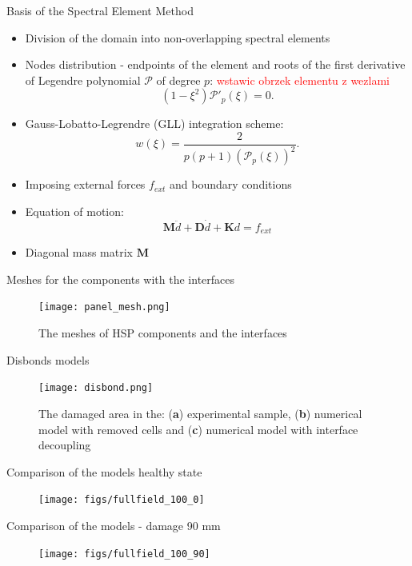 \documentclass[10pt,aspectratio=169]{beamer} %
\begin{document}
\begin{frame}[label=frame8]{Basis of the Spectral Element Method}
	\begin{itemize}
		\item Division of the domain into non-overlapping spectral elements
		\item Nodes distribution - endpoints of the element and roots of the first derivative of Legendre polynomial \(\mathcal{P}\) of degree \(p\):
		\textcolor{red}{wstawic obrzek elementu z wezlami}
		\begin{equation*}
			(1-\xi^2)\mathcal{P}'_{p}(\xi)=0.
			\label{eq:nodes}
		\end{equation*}
		\item Gauss-Lobatto-Legrendre (GLL) integration scheme:
		\begin{equation*}
			{w(\xi)} = \frac{2}{p(p+1)(\mathcal{P}_{p}(\xi))^2}.
			\label{eq:weight}
		\end{equation*}
		\item Imposing external forces \(f_{ext}\) and boundary conditions
		\item Equation of motion:
		\begin{equation*}
			\label{eq:motion}
			\textbf{M} \ddot{d} + \textbf{D} \dot{d} + \textbf{K} d = f_{ext}
		\end{equation*}
		\item Diagonal mass matrix $\textbf{M}$
	\end{itemize}
\end{frame}

\begin{frame}[label=frame11]{Meshes for the components with the interfaces}
	\begin{figure}
		\texttt{[image: panel\_mesh.png]}
		\caption{The meshes of HSP components and the interfaces}
		\label{fig:panel_mesh}
	\end{figure}
\end{frame}
\begin{frame}[label=frame12]{Disbonds models}
	\
	\begin{figure}
		\texttt{[image: disbond.png]}
		\caption{The damaged area in the: (\textbf{a}) experimental sample, (\textbf{b}) numerical model with removed cells and (\textbf{c}) numerical model with interface decoupling}
		\label{fig:disbonds}
	\end{figure}
\end{frame}
\begin{frame}[label=frame11]{Comparison of the models healthy state}
\begin{figure}
	\texttt{[image: figs/fullfield\_100\_0]}
	\label{fig:fulfield_100kHz_0}
\end{figure}
\end{frame}
\begin{frame}[label=frame11]{Comparison of the models - damage 90 mm}
\begin{figure}
	\texttt{[image: figs/fullfield\_100\_90]}
	\label{fig:fulfield_100kHz_90}
\end{figure}
\end{frame}
\end{document}

